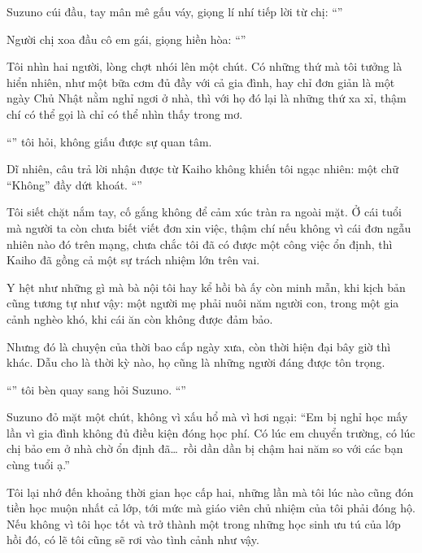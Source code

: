 \documentclass[../main.tex]{subfiles}
\begin{document}
Suzuno cúi đầu, tay mân mê gấu váy, giọng lí nhí tiếp lời từ chị: ``''

Người chị xoa đầu cô em gái, giọng hiền hòa: ``''

Tôi nhìn hai người, lòng chợt nhói lên một chút. Có những thứ mà tôi tưởng là hiển nhiên, như một bữa cơm đủ đầy với cả gia đình, hay chỉ đơn giản là một ngày Chủ Nhật nằm nghỉ ngơi ở nhà, thì với họ đó lại là những thứ xa xỉ, thậm chí có thể gọi là chỉ có thể nhìn thấy trong mơ.

``'' tôi hỏi, không giấu được sự quan tâm.

Dĩ nhiên, câu trả lời nhận được từ Kaiho không khiến tôi ngạc nhiên: một chữ ``Không'' đầy dứt khoát. ``''

Tôi siết chặt nắm tay, cố gắng không để cảm xúc tràn ra ngoài mặt. Ở cái tuổi mà người ta còn chưa biết viết đơn xin việc, thậm chí nếu không vì cái đơn ngẫu nhiên nào đó trên mạng, chưa chắc tôi đã có được một công việc ổn định, thì Kaiho đã gồng cả một sự trách nhiệm lớn trên vai.

Y hệt như những gì mà bà nội tôi hay kể hồi bà ấy còn minh mẫn, khi kịch bản cũng tương tự như vậy: một người mẹ phải nuôi năm người con, trong một gia cảnh nghèo khó, khi cái ăn còn không được đảm bảo.

Nhưng đó là chuyện của thời bao cấp ngày xưa, còn thời hiện đại bây giờ thì khác. Dẫu cho là thời kỳ nào, họ cũng là những người đáng được tôn trọng.

``'' tôi bèn quay sang hỏi Suzuno. ``''

Suzuno đỏ mặt một chút, không vì xấu hổ mà vì hơi ngại: ``Em bị nghỉ học mấy lần vì gia đình không đủ điều kiện đóng học phí. Có lúc em chuyển trường, có lúc chị bảo em ở nhà chờ ổn định đã\dots\ rồi dần dần bị chậm hai năm so với các bạn cùng tuổi ạ.''

Tôi lại nhớ đến khoảng thời gian học cấp hai, những lần mà tôi lúc nào cũng đón tiền học muộn nhất cả lớp, tới mức mà giáo viên chủ nhiệm của tôi phải đóng hộ. Nếu không vì tôi học tốt và trở thành một trong những học sinh ưu tú của lớp hồi đó, có lẽ tôi cũng sẽ rơi vào tình cảnh như vậy.
\end{document}
